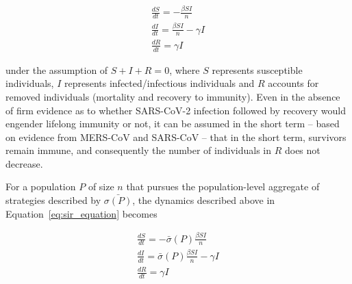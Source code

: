 \documentclass{article}
\begin{document}
\begin{equation}
	\begin{aligned}
		\frac{dS}{dt} = - \frac{\beta S I}{n} 								\\
		\frac{dI}{dt} = \frac{\beta S I}{n} - \gamma I 						\\
		\frac{dR}{dt} = \gamma I
	\end{aligned}
	\label{eq:sir_equation}
\end{equation}

\noindent under the assumption of $S + I + R = 0$, where $S$ represents susceptible individuals, $I$ represents infected/infectious individuals and $R$ accounts for removed individuals (mortality and recovery to immunity). Even in the absence of firm evidence as to whether SARS-CoV-2 infection followed by recovery would engender lifelong immunity or not,\cite{roy2020covid,ota2020will,lin2020duration} it can be assumed in the short term -- based on evidence from MERS-CoV and SARS-CoV -- that in the short term, survivors remain immune,\cite{prompetchara2020immune} and consequently the number of individuals in $R$ does not decrease.

For a population $P$ of size $n$ that pursues the population-level aggregate of strategies described by $\bar{\sigma(P)}$, the dynamics described above in Equation~\eqref{eq:sir_equation} becomes

\begin{equation}
	\begin{aligned}
		\frac{dS}{dt} = - \bar{\sigma}(P) \frac{\beta S I}{n} 				\\
		\frac{dI}{dt} = \bar{\sigma}(P) \frac{\beta S I}{n} - \gamma I 		\\
		\frac{dR}{dt} = \gamma I
	\end{aligned}
	\label{eq:sir_strat_equation}
\end{equation}
\end{document}

